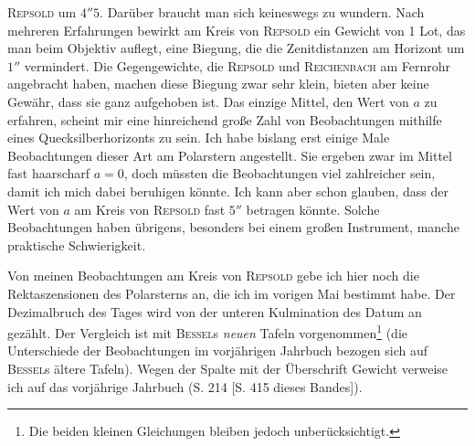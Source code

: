 \textsc{Repsold} um $4''5$. Darüber braucht man sich keineswegs zu wundern. Nach mehreren Erfahrungen bewirkt am Kreis von \textsc{Repsold} ein Gewicht von 1 Lot, das man beim Objektiv auflegt, eine Biegung, die die Zenitdistanzen am Horizont um $1''$ vermindert. Die Gegengewichte, die \textsc{Repsold} und \textsc{Reichenbach} am Fernrohr angebracht haben, machen diese Biegung zwar sehr klein, bieten aber keine Gewähr, dass sie ganz aufgehoben ist. Das einzige Mittel, den Wert von $a$ zu erfahren, scheint mir eine hinreichend große Zahl von Beobachtungen mithilfe eines Quecksilberhorizonts zu sein. Ich habe bislang erst einige Male Beobachtungen dieser Art am Polarstern angestellt. Sie ergeben zwar im Mittel fast haarscharf $a=0$, doch müssten die Beobachtungen viel zahlreicher sein, damit ich mich dabei beruhigen könnte. Ich kann aber schon glauben, dass der Wert von $a$ am Kreis von \textsc{Repsold} fast $5''$ betragen könnte. Solche Beobachtungen haben übrigens, besonders bei einem großen Instrument, manche praktische Schwierigkeit.

\par\indent Von meinen Beobachtungen am Kreis von \textsc{Repsold} gebe ich hier noch die Rektaszensionen des Polarsterns an, die ich im vorigen Mai bestimmt habe. Der Dezimalbruch des Tages wird von der unteren Kulmination des Datum an gezählt. Der Vergleich ist mit \textsc{Bessel}s \emph{neuen} Tafeln vorgenommen\footnote{Die beiden kleinen Gleichungen bleiben jedoch unberücksichtigt.} (die Unterschiede der Beobachtungen im vorjährigen Jahrbuch bezogen sich auf \textsc{Bessel}s ältere Tafeln). Wegen der Spalte mit der Überschrift Gewicht verweise ich auf das vorjährige Jahrbuch (S. 214 [S. 415 dieses Bandes]).

